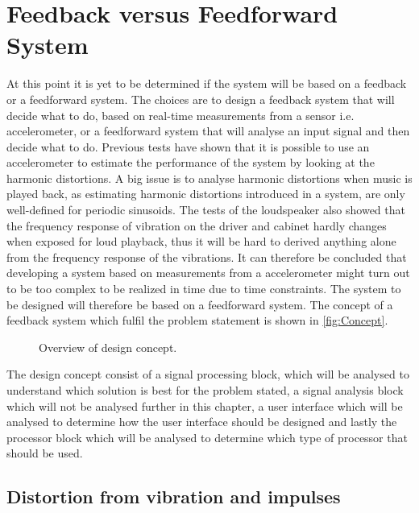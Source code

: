\section{Feedback versus Feedforward System} \label{sec:feedback}

At this point it is yet to be determined if the system will be based on a feedback or a feedforward system. The choices are to design a feedback system that will decide what to do, based on real-time measurements from a sensor i.e. accelerometer, or a feedforward system that will analyse an input signal and then decide what to do. Previous tests have shown that it is possible to use an accelerometer to estimate the performance of the system by looking at the harmonic distortions. A big issue is to analyse harmonic distortions when music is played back, as estimating harmonic distortions introduced in a system, are only well-defined for periodic sinusoids. The tests of the loudspeaker also showed that the frequency response of vibration on the driver and cabinet hardly changes when exposed for loud playback, thus it will be hard to derived anything alone from the frequency response of the vibrations. It can therefore be concluded that developing a system based on measurements from a accelerometer might turn out to be too complex to be realized in time due to time constraints. The system to be designed will therefore be based on a feedforward system. The concept of a feedback system which fulfil the problem statement is shown in \autoref{fig:Concept}.

\begin{figure}[H]
\centering
{}
\scalebox{0.8}{
}
\caption{Overview of design concept.}
\label{fig:Concept}
\end{figure}

The design concept consist of a signal processing block, which will be analysed to understand which solution is best for the problem stated, a signal analysis block which will not be analysed further in this chapter, a user interface which will be analysed to determine how the user interface should be designed and lastly the processor block which will be analysed to determine which type of processor that should be used. 


\subsection{Distortion from vibration and impulses}\label{subsec:impulses}

